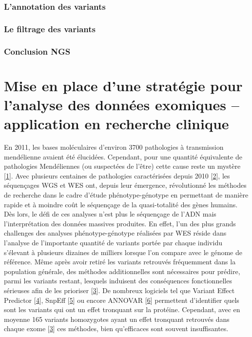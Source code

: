 \documentclass[12pt,a4paper,twoside]{ugathesis}
\begin{document}
\subsection{L'annotation des variants}\label{lannotation-des-variants}

\subsection{Le filtrage des variants}\label{le-filtrage-des-variants}

\subsection{Conclusion NGS}\label{conclusion-ngs}

\chapter{Mise en place d'une stratégie pour l'analyse des données
exomiques -- application en recherche
clinique}\label{mise-en-place-dune-strategie-pour-lanalyse-des-donnees-exomiques-application-en-recherche-clinique}

\newpage

En 2011, les bases moléculaires d'environ 3700 pathologies à
transmission mendélienne avaient été élucidées. Cependant, pour une
quantité équivalente de pathologies Mendéliennes (ou suspectées de
l'être) cette cause reste un mystère
{[}\protect\hyperlink{ref-Amberger2011}{1}{]}. Avec plusieurs centaines
de pathologies caractérisées depuis 2010
{[}\protect\hyperlink{ref-Ng}{2}{]}, les séquençages WGS et WES ont,
depuis leur émergence, révolutionné les méthodes de recherche dans le
cadre d'étude phénotype-génotype en permettant de manière rapide et à
moindre coût le séquençage de la quasi-totalité des gènes humains. Dès
lors, le défi de ces analyses n'est plus le séquençage de l'ADN mais
l'interprétation des données massives produites. En effet, l'un des plus
grands challenges des analyses phénotype-génotype réalisées par WES
réside dans l'analyse de l'importante quantité de variants portée par
chaque individu s'élevant à plusieurs dizaines de milliers lorsque l'on
compare avec le génome de référence. Même après avoir retiré les
variants retrouvés fréquemment dans la population générale, des méthodes
additionnelles sont nécessaires pour prédire, parmi les variants
restant, lesquels induisent des conséquences fonctionnelles sérieuses
afin de les prioriser {[}\protect\hyperlink{ref-Pelak2010}{3}{]}. De
nombreux logiciels tel que Variant Effect Predictor
{[}\protect\hyperlink{ref-McLaren2016}{4}{]}, SnpEff
{[}\protect\hyperlink{ref-Cingolani2012}{5}{]} ou encore ANNOVAR
{[}\protect\hyperlink{ref-Wang2010}{6}{]} permettent d'identifier quels
sont les variants qui ont un effet tronquant sur la protéine. Cependant,
avec en moyenne 165 variants homozygotes ayant un effet tronquant
retrouvés dans chaque exome {[}\protect\hyperlink{ref-Pelak2010}{3}{]}
ces méthodes, bien qu'efficaces sont souvent insuffisantes.
\end{document}
